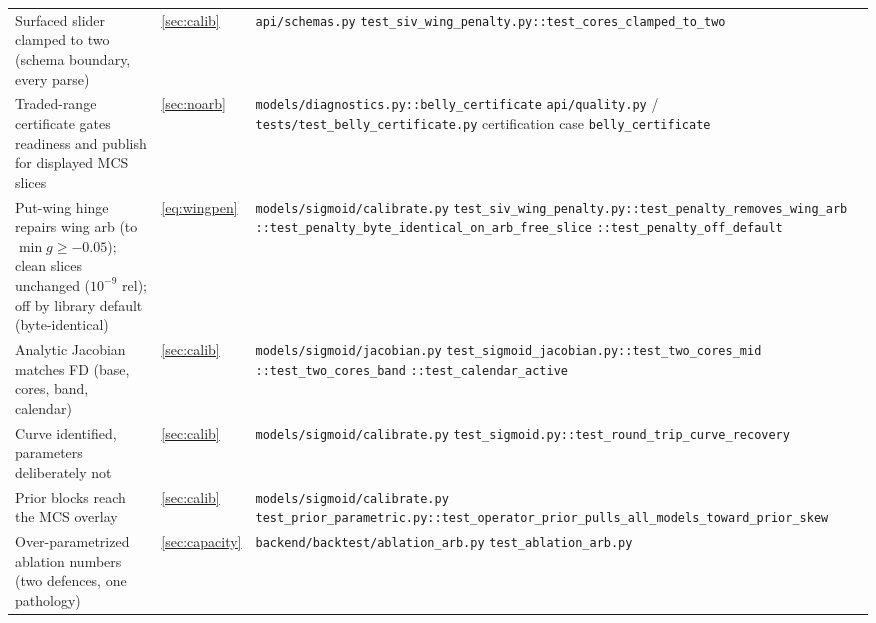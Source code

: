 \documentclass[11pt]{article}
\begin{document}
\begin{longtable}{@{}p{}p{}p{}@{}}
\addlinespace
Surfaced slider clamped to two (schema boundary, every parse) &
\cref{sec:calib} &
\nolinkurl{api/schemas.py}\newline
\nolinkurl{test_siv_wing_penalty.py::test_cores_clamped_to_two}\\
\addlinespace
Traded-range certificate gates readiness and publish for displayed MCS
slices &
\cref{sec:noarb} &
\nolinkurl{models/diagnostics.py::belly_certificate}\newline
\nolinkurl{api/quality.py} /
\nolinkurl{tests/test_belly_certificate.py}\newline
certification case \texttt{belly\_certificate}\\
\addlinespace
Put-wing hinge repairs wing arb (to $\min g\ge-0.05$); clean slices unchanged
($10^{-9}$ rel); off by library default (byte-identical) &
\eqref{eq:wingpen} &
\nolinkurl{models/sigmoid/calibrate.py}\newline
\nolinkurl{test_siv_wing_penalty.py::test_penalty_removes_wing_arb}\newline
\nolinkurl{::test_penalty_byte_identical_on_arb_free_slice}\newline
\nolinkurl{::test_penalty_off_default}\\
\addlinespace
Analytic Jacobian matches FD (base, cores, band, calendar) &
\cref{sec:calib} &
\nolinkurl{models/sigmoid/jacobian.py}\newline
\nolinkurl{test_sigmoid_jacobian.py::test_two_cores_mid}\newline
\nolinkurl{::test_two_cores_band}\newline
\nolinkurl{::test_calendar_active}\\
\addlinespace
Curve identified, parameters deliberately not &
\cref{sec:calib} &
\nolinkurl{models/sigmoid/calibrate.py}\newline
\nolinkurl{test_sigmoid.py::test_round_trip_curve_recovery}\\
\addlinespace
Prior blocks reach the MCS overlay &
\cref{sec:calib} &
\nolinkurl{models/sigmoid/calibrate.py}\newline
\nolinkurl{test_prior_parametric.py::test_operator_prior_pulls_all_models_toward_prior_skew}\\
\addlinespace
Over-parametrized ablation numbers (two defences, one pathology) &
\cref{sec:capacity} &
\nolinkurl{backend/backtest/ablation_arb.py}\newline
\nolinkurl{test_ablation_arb.py}\\
\bottomrule
\end{longtable}
\endgroup
\end{document}
